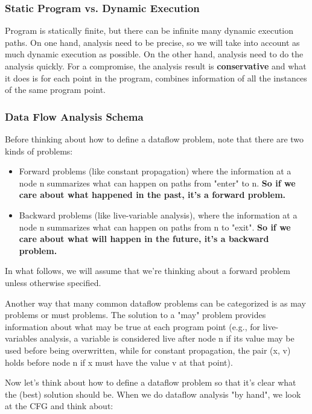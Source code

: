 



\subsubsection{Static Program vs. Dynamic Execution}


Program is statically finite, but there can be infinite many dynamic execution paths. On one hand, analysis
need to be precise, so we will take into account as much dynamic execution as possible. On the other hand, analysis
need to do the analysis quickly. For a compromise, the analysis result is \textbf{conservative} and what it does is for each
point in the program, combines information of all the instances of the same program point.





\subsubsection{Data Flow Analysis Schema}
Before thinking about how to define a dataflow problem, note that there are two kinds of problems:
\begin{itemize}
	\item Forward problems (like constant propagation) where the information at a node n summarizes what can happen on paths from "enter" to n. \textbf{So if we care about what happened in the past, it's a forward problem.}
	\item Backward problems (like live-variable analysis), where the information at a node n summarizes what can happen on paths from n to "exit". \textbf{So if we care about what will happen in the future, it's a backward problem.}
\end{itemize}

In what follows, we will assume that we're thinking about a forward problem unless otherwise specified.

Another way that many common dataflow problems can be categorized is as may problems or must problems.
The solution to a "may" problem provides information about what may be true at each program point (e.g.,
for live-variables analysis, a variable is considered live after node n if its value may be used before
being overwritten, while for constant propagation, the pair (x, v) holds before node n if x must have the value v at that point).

Now let's think about how to define a dataflow problem so that it's clear what the (best) solution should be.
When we do dataflow analysis "by hand", we look at the CFG and think about:

